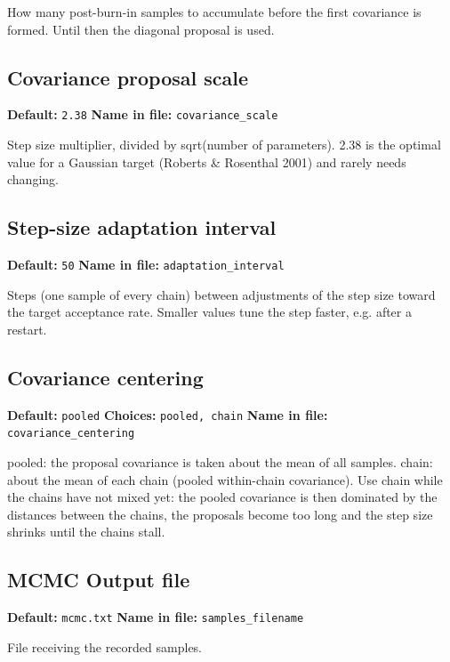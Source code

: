 \documentclass[11pt]{article}
\begin{document}
How many post-burn-in samples to accumulate before the first covariance is formed. Until then the diagonal proposal is used.
\subsection{Covariance proposal scale}
{\small \textbf{Default:} \texttt{2.\allowbreak{}38} \quad\textbullet\quad \textbf{Name in file:} \texttt{covariance\_\allowbreak{}scale}}

Step size multiplier, divided by sqrt(number of parameters). 2.38 is the optimal value for a Gaussian target (Roberts \& Rosenthal 2001) and rarely needs changing.
\subsection{Step-size adaptation interval}
{\small \textbf{Default:} \texttt{50} \quad\textbullet\quad \textbf{Name in file:} \texttt{adaptation\_\allowbreak{}interval}}

Steps (one sample of every chain) between adjustments of the step size toward the target acceptance rate. Smaller values tune the step faster, e.g. after a restart.
\subsection{Covariance centering}
{\small \textbf{Default:} \texttt{pooled} \quad\textbullet\quad \textbf{Choices:} \texttt{pooled, chain} \quad\textbullet\quad \textbf{Name in file:} \texttt{covariance\_\allowbreak{}centering}}

pooled: the proposal covariance is taken about the mean of all samples. chain: about the mean of each chain (pooled within-chain covariance). Use chain while the chains have not mixed yet: the pooled covariance is then dominated by the distances between the chains, the proposals become too long and the step size shrinks until the chains stall.
\subsection{MCMC Output file}
{\small \textbf{Default:} \texttt{mcmc.\allowbreak{}txt} \quad\textbullet\quad \textbf{Name in file:} \texttt{samples\_\allowbreak{}filename}}

File receiving the recorded samples.
\end{document}
